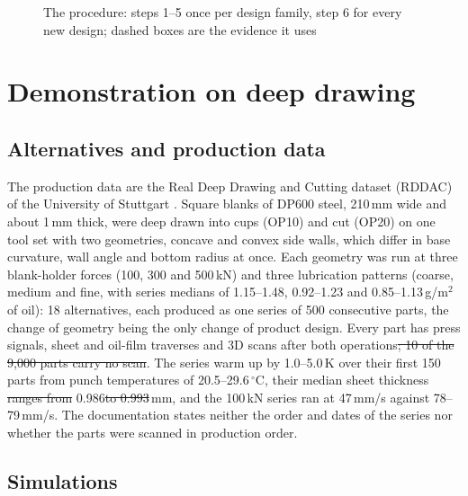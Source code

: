 \documentclass[pdflatex,sn-basic,lineno]{sn-jnl}
\providecommand{\DIFadd}[1]{{\protect\color{blue}\uwave{#1}}} %
\providecommand{\DIFdel}[1]{{\protect\color{red}\sout{#1}}}                      %
\providecommand{\DIFaddbegin}{} %
\providecommand{\DIFaddend}{} %
\providecommand{\DIFdelbegin}{} %
\providecommand{\DIFdelend}{} %
\newcommand{\DIFscaledelfig}{0.5}
\newlength{\DIFdelgraphicswidth} %
\newlength{\DIFdelgraphicsheight} %
\newcommand{\DIFaddincludegraphics}[2][]{{\color{blue}\fbox{\DIFOincludegraphics[#1]{#2}}}} %
\newcommand{\DIFdelincludegraphics}[2][]{%
\sbox{\DIFdelgraphicsbox}{\DIFOincludegraphics[#1]{#2}}%
\settoboxwidth{\DIFdelgraphicswidth}{\DIFdelgraphicsbox} %
\settoboxtotalheight{\DIFdelgraphicsheight}{\DIFdelgraphicsbox} %
\scalebox{\DIFscaledelfig}{%
\parbox[b]{\DIFdelgraphicswidth}{\usebox{\DIFdelgraphicsbox}\\[-\baselineskip] \rule{\DIFdelgraphicswidth}{0em}}\llap{\resizebox{\DIFdelgraphicswidth}{\DIFdelgraphicsheight}{%
\setlength{\unitlength}{\DIFdelgraphicswidth}%
\begin{picture}(1,1)%
\thicklines\linethickness{2pt} %
{\color[rgb]{1,0,0}\put(0,0){\framebox(1,1){}}}%
{\color[rgb]{1,0,0}\put(0,0){\line( 1,1){1}}}%
{\color[rgb]{1,0,0}\put(0,1){\line(1,-1){1}}}%
\end{picture}%
}\hspace*{3pt}}} %
} %
\DeclareRobustCommand{\DIFaddbegin}{\DIFOaddbegin \let\includegraphics\DIFaddincludegraphics} %
\DeclareRobustCommand{\DIFaddend}{\DIFOaddend \let\includegraphics\DIFOincludegraphics} %
\DeclareRobustCommand{\DIFdelbegin}{\DIFOdelbegin \let\includegraphics\DIFdelincludegraphics} %
\DeclareRobustCommand{\DIFdelend}{\DIFOaddend \let\includegraphics\DIFOincludegraphics} %
\begin{document}
\begin{figure}[t]
\centering

\caption{The procedure: steps 1--5 once per design family, step 6 for every new design; dashed boxes are the evidence it uses}\label{fig:procedure}
\end{figure}

\section{Demonstration on deep drawing}\label{sec:demo}

\subsection{Alternatives and production data}\label{sec:data}

The production data are the Real Deep Drawing and Cutting dataset (RDDAC) of the University of Stuttgart \citep{baum2026rddac, baum2026statistical}. Square blanks of DP600 steel, 210\,mm wide and about 1\,mm thick, were deep drawn into cups (OP10) and cut (OP20) on one tool set with two geometries, concave and convex side walls, which differ in base curvature, wall angle and bottom radius at once. Each geometry was run at three blank-holder forces (100, 300 and 500\,kN) and three lubrication patterns (coarse, medium and fine, with series medians of 1.15--1.48, 0.92--1.23 and 0.85--1.13\,g/m$^2$ of oil): 18 alternatives, each produced as one series of 500 consecutive parts, the change of geometry being the only change of product design. Every part has press signals, sheet and oil-film traverses and 3D scans after both operations\DIFdelbegin \DIFdel{; 10 of the 9,000 parts carry no scan}\DIFdelend . The series warm up by 1.0--5.0\,K over their first 150 parts from punch temperatures of 20.5--29.6\,$^\circ$C, their median sheet thickness \DIFdelbegin \DIFdel{ranges from }\DIFdelend \DIFaddbegin \DIFadd{is }\DIFaddend 0.986\DIFdelbegin \DIFdel{to 0.993}\DIFdelend \DIFaddbegin \DIFadd{--0.993}\DIFaddend \,mm, and the 100\,kN series ran at 47\,mm/s against 78--79\,mm/s. The documentation states neither the order and dates of the series nor whether the parts were scanned in production order.

\subsection{Simulations}\label{sec:sims}
\end{document}
